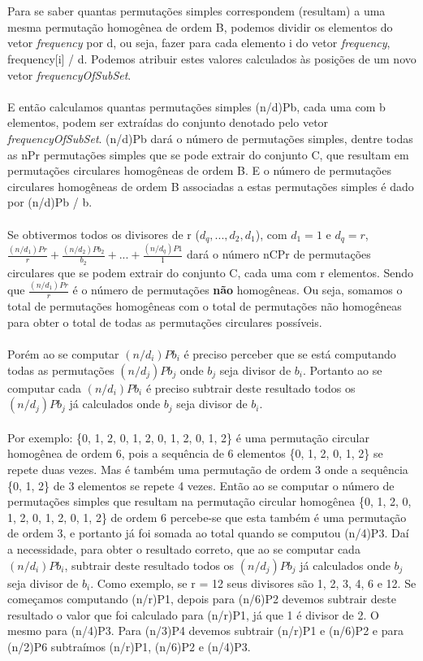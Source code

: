 \documentclass[a4paper,12pt,openany]{book}
\begin{document}
\\
\\
Para se saber quantas permutações simples correspondem (resultam) a uma mesma permutação homogênea de ordem B, podemos dividir os elementos do vetor \textit{frequency} por d, ou seja, fazer para cada elemento i do vetor \textit{frequency}, frequency[i] / d. Podemos atribuir estes valores calculados às posições de um novo vetor\textit{ frequencyOfSubSet}.
\\
\\
E então calculamos quantas permutações simples (n/d)Pb, cada uma com b elementos, podem ser extraídas do conjunto denotado pelo vetor\textit{ frequencyOfSubSet}. (n/d)Pb dará o número de permutações simples, dentre todas as nPr permutações simples que se pode extrair do conjunto C, que resultam em permutações circulares homogêneas de ordem B. E o número de permutações circulares homogêneas de ordem B associadas a estas permutações simples é dado por (n/d)Pb / b.
\\
\\
Se obtivermos todos os divisores de r ($ d_q, ..., d_2, d_1 $), com $ d_1 = 1 \text{ e }d_q = r $, $ \frac{(n/d_1)Pr}{r} + \frac{(n/d_2)Pb_2}{b_2} + ... + \frac{(n/d_q)P1}{1}$ dará o número nCPr de permutações circulares que se podem extrair do conjunto C, cada uma com r elementos. Sendo que $ \frac{(n/d_1)Pr}{r} $ é o número de permutações \textbf{não} homogêneas. Ou seja, somamos o total de permutações homogêneas com o total de permutações não homogêneas para obter o total de todas as permutações circulares possíveis.
\\
\\
Porém ao se computar $ (n/d_i)Pb_i $ é preciso perceber que se está computando todas as permutações  $ (n/d_j)Pb_j $ onde $ b_j $ seja divisor de $ b_i $. Portanto ao se computar cada $ (n/d_i)Pb_i $ é preciso subtrair deste resultado todos os $ (n/d_j)Pb_j $ já calculados onde $ b_j $ seja divisor de $ b_i $.
\\
\\
Por exemplo: \{0, 1, 2, 0, 1, 2, 0, 1, 2, 0, 1, 2\} é uma permutação circular homogênea de ordem 6, pois a sequência de 6 elementos \{0, 1, 2, 0, 1, 2\} se repete duas vezes. Mas é também uma permutação de ordem 3 onde a sequência \{0, 1, 2\} de 3 elementos se repete 4 vezes. Então ao se computar o número de permutações simples que resultam na permutação circular homogênea \{0, 1, 2, 0, 1, 2, 0, 1, 2, 0, 1, 2\} de ordem 6 percebe-se que esta também é uma permutação de ordem 3, e portanto já foi somada ao total quando se computou (n/4)P3. Daí a necessidade, para obter o resultado correto, que ao se computar cada $ (n/d_i)Pb_i $,  subtrair deste resultado todos os $ (n/d_j)Pb_j $ já calculados onde $ b_j $ seja divisor de $ b_i $. Como exemplo, se r = 12 seus divisores são 1, 2, 3, 4, 6 e 12. Se começamos computando (n/r)P1, depois para (n/6)P2 devemos subtrair deste resultado o valor que foi calculado para (n/r)P1, já que 1 é divisor de 2. O mesmo para (n/4)P3. Para (n/3)P4 devemos subtrair (n/r)P1 e (n/6)P2 e para (n/2)P6 subtraímos (n/r)P1, (n/6)P2 e (n/4)P3.
\end{document}
